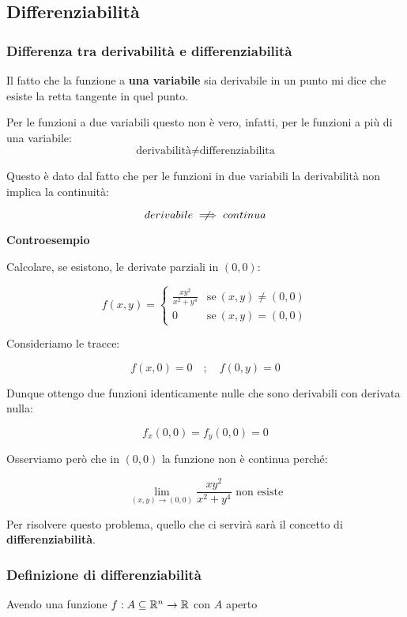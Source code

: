 \subsection{Differenziabilità}

\subsubsection{Differenza tra derivabilità e differenziabilità}

Il fatto che la funzione a \textbf{una variabile} sia derivabile in un punto mi dice che esiste la retta tangente in quel punto.

Per le funzioni a due variabili questo non è vero, infatti, per le funzioni a più di una variabile:
\[\text{derivabilità} \ne \text{differenziabilita}\]

Questo è dato dal fatto che per le funzioni in due variabili la derivabilità non implica la continuità:

\[
    derivabile \centernot\implies continua
\]

\textbf{Controesempio}

Calcolare, se esistono, le derivate parziali in \((0,0)\):

\[
    f(x,y)=
    \begin{cases}
        \frac{xy^{2}}{x^{2}+y^{4}} & \text{se}\ (x,y)\neq (0,0) \\
        0                          & \text{se}\ (x,y)=(0,0)
    \end{cases}
\]

Consideriamo le tracce:

\[
    f(x,0) = 0 \quad;\quad f(0,y) =0
\]

Dunque ottengo due funzioni identicamente nulle che sono derivabili con derivata nulla:

\[
    f_x(0,0) = f_y(0,0) = 0
\]

Osserviamo però che in \((0,0)\) la funzione non è continua perché:

\[
    \lim_{ (x,y) \to (0,0) } \frac{xy^{2}}{x^{2}+y^{4}} \text{ non esiste}
\]

Per risolvere questo problema, quello che ci servirà sarà il concetto di \textbf{differenziabilità}.

\filbreak{}
\subsubsection{Definizione di differenziabilità}

Avendo una funzione \(f:A\subseteq \mathbb{R}^{n}  \rightarrow \mathbb{R} \) con \(A\) aperto

